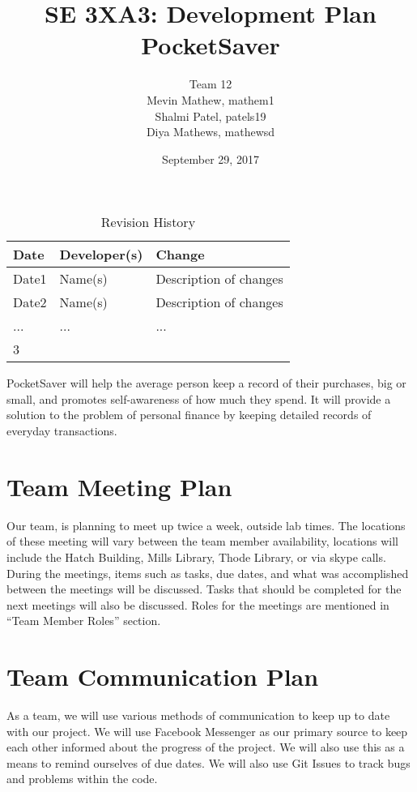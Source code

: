 \documentclass{article}
\title{SE 3XA3: Development Plan\\PocketSaver}
\author{Team 12
		\\ Mevin Mathew, mathem1
		\\ Shalmi Patel, patels19
		\\ Diya Mathews, mathewsd
}
\date{September 29, 2017}
\begin{document}
\begin{table}[hp]
\caption{Revision History} \label{TblRevisionHistory}
\begin{tabularx}{\textwidth}{llX}
\toprule
\textbf{Date} & \textbf{Developer(s)} & \textbf{Change}\\
\midrule
Date1 & Name(s) & Description of changes\\
Date2 & Name(s) & Description of changes\\
... & ... & ...\\
\bottomrule3
\end{tabularx}
\end{table}

\newpage

\maketitle

PocketSaver will help the average person keep a record of their purchases, big or small, and promotes self-awareness of how much they spend. It will provide a solution to the problem of personal finance by keeping detailed records of everyday transactions.

\section{Team Meeting Plan}
Our team, is planning to meet up twice a week, outside lab times. The locations of these meeting will vary between the team member availability, locations will include the Hatch Building, Mills Library, Thode Library, or via skype calls. During the meetings, items such as tasks, due dates, and what was accomplished between the meetings will be discussed. Tasks that should be completed for the next meetings will also be discussed. Roles for the meetings are mentioned in “Team Member Roles” section.

\section{Team Communication Plan}
As a team, we will use various methods of communication to keep up to date with our project. We will use Facebook Messenger as our primary source to keep each other informed about the progress of the project. We will also use this as a means to remind ourselves of due dates. We will also use Git Issues to track bugs and problems within the code.

\newpage
\end{document}
